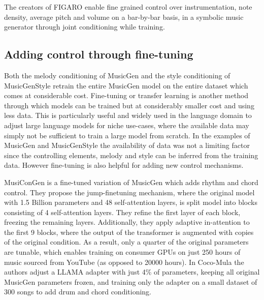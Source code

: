 The creators of FIGARO\cite{Rütte_figaro_2023} enable fine grained control over instrumentation, note density, average pitch and volume on a bar-by-bar basis, in a symbolic music generator through joint conditioning while training. 

\subsection{Adding control through fine-tuning}

Both the melody conditioning of MusicGen \cite{copet2023simple} and the style conditioning of MusicGenStyle \cite{Rouard_Adi_Copet_Roebel_Défossez_musicgenstyle_2024} retrain the entire MusicGen model on the entire dataset which comes at considerable cost. Fine-tuning or transfer learning is another method through which models can be trained but at considerably smaller cost and using less data. This is particularly useful and widely used in the language domain to adjust large language models for niche use-cases, where the available data may simply not be sufficient to train a large model from scratch. In the examples of MusicGen and MusicGenStyle the availability of data was not a limiting factor since the controlling elements, melody and style can be inferred from the training data. However fine-tuning is also helpful for adding new control mechanisms.

MusiConGen \cite{Lan_Hsiao_Cheng_Yang_musicongen_2024} is a fine-tuned variation of MusicGen which adds rhythm and chord control. They propose the jump-finetuning mechanism, where the original model with 1.5 Billion parameters and 48 self-attention layers, is split model into blocks consisting of 4 self-attention layers. They refine the first layer of each block, freezing the remaining layers. Additionally, they apply adaptive in-attention to the first 9 blocks, where the output of the transformer is augmented with copies of the original condition. As a result, only a quarter of the original parameters are tunable, which enables training on consumer GPUs on just 250 hours of music sourced from YouTube (as opposed to 20000 hours).  In Coco-Mula \cite{Lin_cocomulla_2024} the authors adjust a LLAMA adapter with just 4\% of parameters, keeping all original MusicGen parameters frozen, and training only the adapter on a small dataset of 300 songs to add drum and chord conditioning. 

